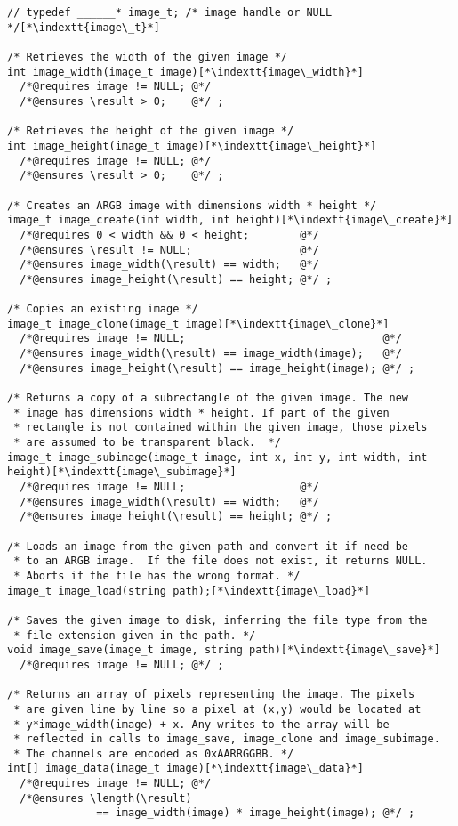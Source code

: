 \documentclass[11pt]{article}
\makeatletter
\newcommand{\indextt}[1]{\index{#1@\texttt{#1}}}
\makeatother
\begin{document}
\begin{lstlisting}
// typedef ______* image_t; /* image handle or NULL */[*\indextt{image\_t}*]

/* Retrieves the width of the given image */
int image_width(image_t image)[*\indextt{image\_width}*]
  /*@requires image != NULL; @*/
  /*@ensures \result > 0;    @*/ ;

/* Retrieves the height of the given image */
int image_height(image_t image)[*\indextt{image\_height}*]
  /*@requires image != NULL; @*/
  /*@ensures \result > 0;    @*/ ;

/* Creates an ARGB image with dimensions width * height */
image_t image_create(int width, int height)[*\indextt{image\_create}*]
  /*@requires 0 < width && 0 < height;        @*/
  /*@ensures \result != NULL;                 @*/
  /*@ensures image_width(\result) == width;   @*/
  /*@ensures image_height(\result) == height; @*/ ;

/* Copies an existing image */
image_t image_clone(image_t image)[*\indextt{image\_clone}*]
  /*@requires image != NULL;                               @*/
  /*@ensures image_width(\result) == image_width(image);   @*/
  /*@ensures image_height(\result) == image_height(image); @*/ ;

/* Returns a copy of a subrectangle of the given image. The new
 * image has dimensions width * height. If part of the given
 * rectangle is not contained within the given image, those pixels
 * are assumed to be transparent black.  */
image_t image_subimage(image_t image, int x, int y, int width, int height)[*\indextt{image\_subimage}*]
  /*@requires image != NULL;                  @*/
  /*@ensures image_width(\result) == width;   @*/
  /*@ensures image_height(\result) == height; @*/ ;

/* Loads an image from the given path and convert it if need be
 * to an ARGB image.  If the file does not exist, it returns NULL.
 * Aborts if the file has the wrong format. */
image_t image_load(string path);[*\indextt{image\_load}*]

/* Saves the given image to disk, inferring the file type from the
 * file extension given in the path. */
void image_save(image_t image, string path)[*\indextt{image\_save}*]
  /*@requires image != NULL; @*/ ;

/* Returns an array of pixels representing the image. The pixels
 * are given line by line so a pixel at (x,y) would be located at
 * y*image_width(image) + x. Any writes to the array will be
 * reflected in calls to image_save, image_clone and image_subimage.
 * The channels are encoded as 0xAARRGGBB. */
int[] image_data(image_t image)[*\indextt{image\_data}*]
  /*@requires image != NULL; @*/
  /*@ensures \length(\result)
              == image_width(image) * image_height(image); @*/ ;
\end{lstlisting}
\end{document}
